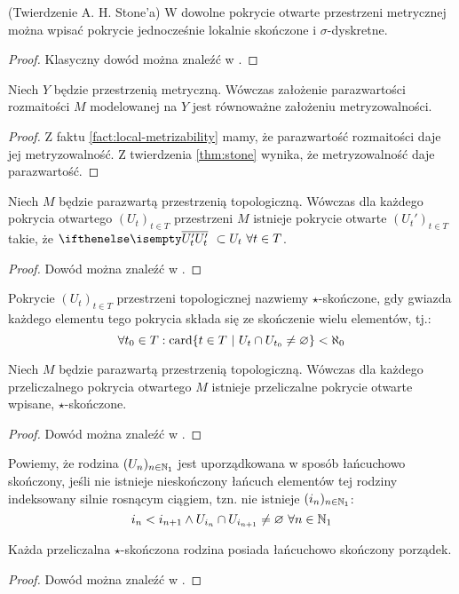 \begin{thm}(Twierdzenie A. H. Stone'a)
  \label{thm:stone}
  W dowolne pokrycie otwarte przestrzeni metrycznej można wpisać pokrycie jednocześnie lokalnie skończone i $\sigma$-dyskretne.
  \begin{proof}
    Klasyczny dowód można znaleźć w \cite{eng}.
  \end{proof}
\end{thm}
 
\begin{cor}
  Niech $Y$ będzie przestrzenią metryczną. Wówczas założenie parazwartości rozmaitości $M$ modelowanej na $Y$ jest równoważne założeniu metryzowalności.
  \begin{proof}
    Z faktu \ref{fact:local-metrizability} mamy, że parazwartość rozmaitości daje jej metryzowalność. Z twierdzenia \ref{thm:stone} wynika, że metryzowalność daje parazwartość.
  \end{proof}
\end{cor}
 
\begin{lem} \label{lem:cl-refinement}
  Niech $M$ będzie parazwartą przestrzenią topologiczną. Wówczas dla każdego pokrycia otwartego $(U_t)_{t \in T}$ przestrzeni $M$ istnieje pokrycie otwarte $(U_t')_{t \in T}$ takie, że $\cl{U_t'}\ \subset U_t\ \forall t \in T$.
  \begin{proof}
    Dowód można znaleźć w \cite{eng}.
  \end{proof}
\end{lem}
 
\begin{df}
  Pokrycie $(U_t)_{t \in T}$ przestrzeni topologicznej nazwiemy $\star$-skończone, gdy gwiazda każdego elementu tego pokrycia składa się ze skończenie wielu elementów, tj.:
  \[
    \forall t_0 \in T: \operatorname{card}\{t \in T\ |\ U_t \cap U_{t_0} \neq \varnothing\} < \aleph_0
  \]
\end{df}
 
\begin{lem} \label{lem:star-finite}
  Niech $M$ będzie parazwartą przestrzenią topologiczną. Wówczas dla każdego przeliczalnego pokrycia otwartego $M$ istnieje przeliczalne pokrycie otwarte wpisane, $\star$-skończone.
  \begin{proof}
    Dowód można znaleźć w \cite{bp}.
  \end{proof}
\end{lem}
 
\begin{df}
  Powiemy, że rodzina $(U_n)_{n\in{\mathbb{N}_1}}$ jest uporządkowana w sposób łańcuchowo skończony, jeśli nie istnieje nieskończony łańcuch elementów tej rodziny indeksowany silnie rosnącym ciągiem, tzn. nie istnieje $(i_n)_{n\in{\mathbb{N}_1}}$:
  \[
    i_n < i_{n+1} \wedge U_{i_n} \cap U_{i_{n+1}} \neq \varnothing\ \forall n\in{\mathbb{N}_1}
  \]
\end{df}
 
\begin{lem} \label{lem:chain-finite-order}
  Każda przeliczalna $\star$-skończona rodzina posiada łańcuchowo skończony porządek.
  \begin{proof}
    Dowód można znaleźć w \cite{bp}.
  \end{proof}
\end{lem}